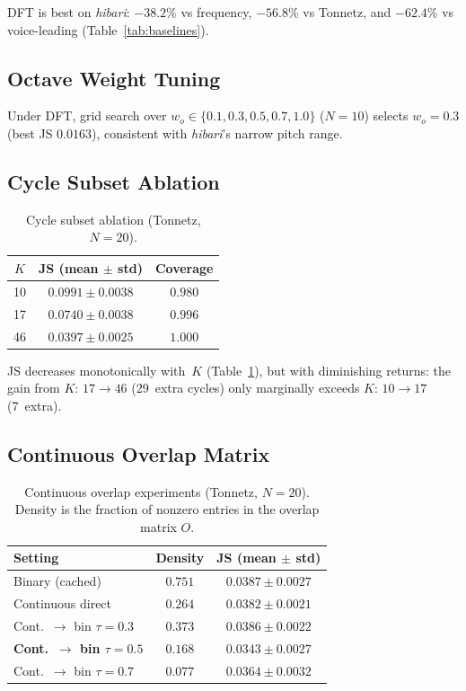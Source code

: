 \documentclass[conference,10pt,a4paper]{IEEEtran}
\begin{document}
DFT is best on \emph{hibari}: $-38.2\%$ vs frequency, $-56.8\%$ vs Tonnetz,
and $-62.4\%$ vs voice-leading (Table~\ref{tab:baselines}).

\subsection{Octave Weight Tuning}
\label{subsec:octave}

Under DFT, grid search over $w_o \in \{0.1, 0.3, 0.5, 0.7, 1.0\}$
($N=10$) selects $w_o=0.3$ (best JS $0.0163$), consistent with
\emph{hibari}'s narrow pitch range.

\subsection{Cycle Subset Ablation}

\begin{table}[t]
\centering
\caption{Cycle subset ablation (Tonnetz, $N=20$).}
\label{tab:ablation}
\begin{tabular}{ccc}
\toprule
$K$ & JS (mean $\pm$ std) & Coverage \\
\midrule
10  & $0.0991 \pm 0.0038$ & $0.980$ \\
17  & $0.0740 \pm 0.0038$ & $0.996$ \\
46  & $\mathbf{0.0397 \pm 0.0025}$ & $1.000$ \\
\bottomrule
\end{tabular}
\end{table}

JS decreases monotonically with~$K$ (Table~\ref{tab:ablation}), but
with diminishing returns: the gain from $K{:}\,17 \to 46$ (29~extra
cycles) only marginally exceeds $K{:}\,10 \to 17$ (7~extra).

\subsection{Continuous Overlap Matrix}
\label{subsec:continuous}

\begin{table}[t]
\centering
\caption{Continuous overlap experiments (Tonnetz, $N=20$).
Density is the fraction of nonzero entries in the overlap matrix $O$.}
\label{tab:continuous}
\begin{tabular}{lcc}
\toprule
Setting & Density & JS (mean $\pm$ std) \\
\midrule
Binary (cached)           & $0.751$ & $0.0387 \pm 0.0027$ \\
Continuous direct         & $0.264$ & $0.0382 \pm 0.0021$ \\
Cont.\ $\to$ bin $\tau{=}0.3$ & $0.373$ & $0.0386 \pm 0.0022$ \\
\textbf{Cont.\ $\to$ bin $\tau{=}0.5$} & $\mathbf{0.168}$ & $\mathbf{0.0343 \pm 0.0027}$ \\
Cont.\ $\to$ bin $\tau{=}0.7$ & $0.077$ & $0.0364 \pm 0.0032$ \\
\bottomrule
\end{tabular}
\end{table}
\end{document}
